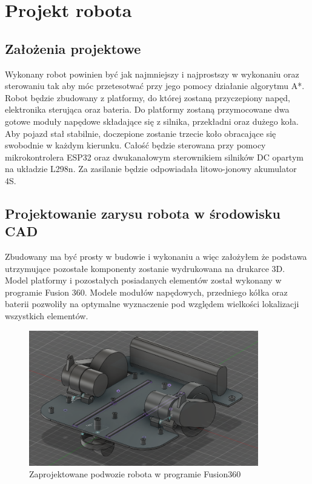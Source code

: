 \section{Projekt robota}
\subsection{Założenia projektowe}
Wykonany robot powinien być jak najmniejszy i najprostszy w wykonaniu oraz sterowaniu tak aby móc przetesotwać przy jego pomocy działanie algorytmu A*. 
Robot będzie zbudowany z platformy, do której zostaną przyczepiony napęd, elektronika sterująca oraz bateria. 
Do platformy zostaną przymocowane dwa gotowe moduły napędowe składające się z silnika, przekładni oraz dużego koła. 
Aby pojazd stał stabilnie, doczepione zostanie trzecie koło obracające się swobodnie w każdym kierunku.
Całość będzie sterowana przy pomocy mikrokontrolera ESP32 oraz dwukanałowym sterownikiem silników DC opartym na układzie L298n.
Za zasilanie będzie odpowiadała litowo-jonowy akumulator 4S.

\subsection{Projektowanie zarysu robota w środowisku CAD}
Zbudowany ma być prosty w budowie i wykonaniu a więc założyłem że podstawa utrzymujące pozostałe komponenty
zostanie wydrukowana na drukarce 3D. Model platformy i pozostałych posiadanych elementów został wykonany w programie Fusion 360.
Modele modułów napędowych, przedniego kółka oraz baterii pozwoliły na optymalne wyznaczenie pod względem wielkości lokalizacji wszystkich elementów.


\begin{figure}[H]
	\centering
	\includegraphics[width=10cm]{pages/robot/zdjecia/robotModelCaly.png}
	\caption{Zaprojektowane podwozie robota w programie Fusion360}
	\label{fig:Rys}
\end{figure}

